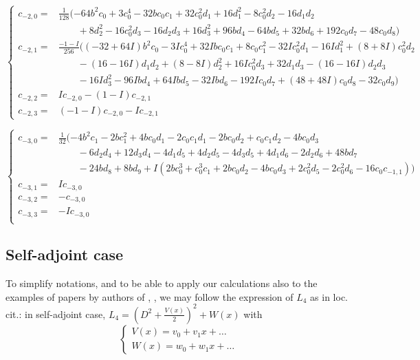 \documentclass[11pt]{article}
\theoremstyle{definition}
\theoremstyle{plain}
\numberwithin{equation}{section}
\begin{document}
$
\left\{\begin{aligned}
	c_{-2, 0}=&\frac{1}{128}(-64 b^2 c_0 + 3 c_0^4 - 32 b c_0 c_1 + 32 c_0^2 d_1 + 16 d_1^2 - 
	8 c_0^2 d_2 - 16 d_1 d_2 
	\\&\qquad + 8 d_2^2 - 16 c_0^2 d_3 - 16 d_2 d_3 + 16 d_3^2 + 
	96 b d_4 - 64 b d_5 + 32 b d_6 + 192 c_0 d_7 - 48 c_0 d_8)
	\\c_{-2,1}=&\frac{-1-I}{256}((-32 + 64 I) b^2 c_0 - 3 I c_0^4 + 32 I b c_0 c_1 + 8 c_0 c_1^2 - 
	32 I c_0^2 d_1- 16 I d_1^2+ (8 + 8 I) c_0^2 d_2
	\\&\qquad  - (16 - 16 I) d_1 d_2 + (8 - 
	8 I) d_2^2  + 16 I c_0^2 d_3 + 32 d_1 d_3 - (16 - 16 I) d_2 d_3
	\\&\qquad - 16 I d_3^2 - 96 I b d_4 + 64 I b d_5 - 32 I b d_6 - 
	192 I c_0 d_7 + (48 + 48 I) c_0 d_8 - 32 c_0 d_9)
	\\c_{-2,2} =& I c_{-2,0} - (1 - I) c_{-2,1}
	\\c_{-2,3} =& (-1 - I) c_{-2,0} - I c_{-2,1}
\end{aligned}\right.
$

$
\left\{\begin{aligned}
c_{-3,0} =& \frac{1}{32}(-4 b^2 c_1 - 2 b c_1^2 + 4 b c_0 d_1 - 2 c_0 c_1 d_1 - 2 b c_0 d_2 + 
c_0 c_1 d_2 - 4 b c_0 d_3
\\&\qquad - 6 d_2 d_4 + 12 d_3 d_4 - 4 d_1 d_5 + 4 d_2 d_5 - 
4 d_3 d_5 + 4 d_1 d_6 - 2 d_2 d_6 + 48 b d_7 
\\&\qquad - 24 b d_8 + 8 b d_9+ I (2 b c_0^3 + c_0^3 c_1 + 2 b c_0 d_2 - 4 b c_0 d_3 + 2 c_0^2 d_5 - 
2 c_0^2 d_6 - 16 c_0 c_{-1, 1}))
\\c_{-3,1} =& I c_{-3,0}\\
c_{-3,2} =& -c_{-3,0} \\
c_{-3,3} =& -I c_{-3,0}\\
\end{aligned}
\right.
$


\subsection{Self-adjoint case}
\label{S:self-adjoint}

To simplify notations, and to be able to apply our calculations also to the examples of papers by authors of \cite{MZh}, \cite{SMZh}, we may follow the expression of $L_4$ as in loc. cit.: in self-adjoint case, $L_4=(D^2+\frac{V(x)}{2})^2+W(x)$ with
$$
\begin{cases}
V(x)=v_0+v_1x+\dots
\\W(x)=w_0+w_1x+\dots
\end{cases}
$$
\end{document}
